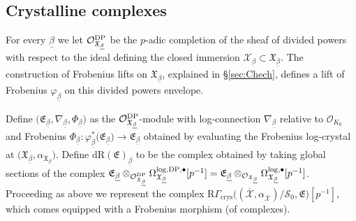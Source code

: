 \documentclass[asterisque,english]{smfart}
\begin{document}
\subsection{Crystalline complexes}\label{sssec:explcictcrystallne}

For every $\underline{\beta}$ we let $\mathcal{O}_{\mathfrak{X}_{\underline{\beta}}}^{\rm DP}$ be the $p$-adic completion of the sheaf of divided powers with respect to the ideal defining the closed immersion $\mathcal{X}_{\underline{\beta}} \subset  \mathfrak{X}_{\underline{\beta}}$. 
The construction of Frobenius lifts on $\mathfrak{X}_{\underline{\beta}}$, explained in \S \ref{sec:Chech}, defines  a lift of Frobenius  $\varphi_{\underline{\beta}}$ on this divided powers envelope.
 



Define $\bigl(\mathfrak{E}_{\underline {\beta}}, \nabla_{\underline{\beta}}, \Phi_{\underline{\beta}}\bigr)$ as the $\mathcal{O}_{\mathfrak{X}_{\underline{\beta}}}^{\rm DP}$-module with log-connection $\nabla_{\underline{\beta}}$ relative to $\mathcal{O}_{K_0}$ and Frobenius $\Phi_{\underline{\beta}} \colon \varphi_{\underline{\beta}}^\ast\bigl(\mathfrak{E}_{\underline {\beta}}\bigr)\to \mathfrak{E}_{\underline {\beta}} $ obtained by evaluating the Frobenius log-crystal at $\bigl(\mathfrak{X}_{\underline{\beta}}, \alpha_{\mathfrak{X}_{\underline{\beta}}}\bigr)$.  Define $\mathrm{dR}(\mathfrak{E})_{\underline{\beta}}$ to be the complex obtained by taking global sections of the complex  $\mathfrak{E}_{\underline {\beta}} \otimes_{\mathcal{O}_{\mathfrak{X}_{\underline{\beta}}}^{\rm DP}}  \Omega_{\mathfrak{X}_{\underline{\beta}}}^{\log,{\rm DP},\bullet}[p^{-1}]=\mathfrak{E}_{\underline {\beta}} \otimes_{\mathcal{O}_{\mathfrak{X}_{\underline{\beta}}}}  \Omega_{\mathfrak{X}_{\underline{\beta}}}^{\log,\bullet}[p^{-1}]$.  Proceeding as above we represent the complex $\mathrm{R}\Gamma_{\mathrm{crys}}\bigl((\overline{\mathcal{X}},\alpha_{\overline{\mathcal{X}}})/\mathcal{S}_0,\mathfrak{E}\bigr) [p^{-1}] $, which comes equipped with a Frobenius morphism (of complexes).
\end{document}
